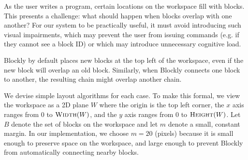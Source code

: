 \documentclass[]{article}
\begin{document}

As the user writes a program, certain locations on the workspace fill with blocks.
This presents a challenge: what should happen when blocks overlap with one another?
For our system to be practically useful, it must avoid introducing such visual impairments,
which may prevent the user from issuing commands (e.g. if they cannot see a block ID)
or which may introduce unnecessary cognitive load.

Blockly by default places new blocks at the top left of the workspace, even if the new block
will overlap an old block. Similarly, when Blockly connects one block to another, the resulting chain
might overlap another chain.

We devise simple layout algorithms for each case. To make this formal, we view
the workspace as a 2D plane $W$ where the origin is the top left corner, the $x$ axis ranges from 0
to $\textsc{Width}(W)$, and the $y$ axis ranges from 0 to $\textsc{Height}(W)$.
Let $B$ denote the set of blocks on the workspace and let $m$ denote a small, constant margin.
In our implementation, we choose $m = 20$ (pixels) because it is small enough to preserve space
on the workspace, and large enough to prevent Blockly from automatically connecting nearby blocks.
\end{document}
